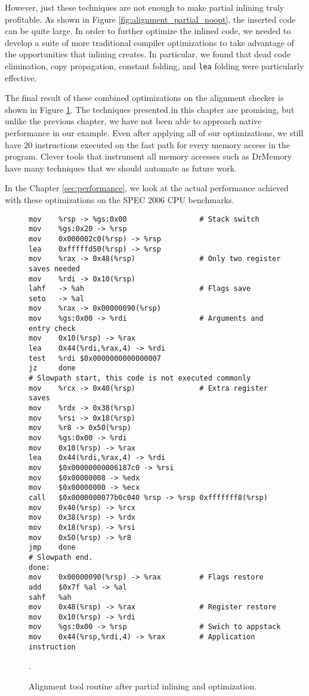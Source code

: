 However, just these techniques are not enough to make partial inlining truly
profitable.  As shown in Figure \ref{fig:alignment_partial_noopt}, the inserted
code can be quite large.  In order to further optimize the inlined code, we
needed to develop a suite of more traditional compiler optimizations to take
advantage of the opportunities that inlining creates.  In particular, we found
that dead code elimination, copy propagation, constant folding, and {\tt lea}
folding were particularly effective.

The final result of these combined optimizations on the alignment checker is
shown in Figure \ref{fig:alignment_all_opt}.  The techniques presented in this
chapter are promising, but unlike the previous chapter, we have not been able to
approach native performance in our example.  Even after applying all of our
optimizations, we still have 20 instructions executed on the fast path for every
memory access in the program.  Clever tools that instrument all memory accesses
such as DrMemory have many techniques that we should automate as future work.

In the Chapter \ref{sec:performance}, we look at the actual performance achieved
with these optimizations on the SPEC 2006 CPU benchmarks.

\begin{figure}
\begin{verbatim}
mov    %rsp -> %gs:0x00                 # Stack switch
mov    %gs:0x20 -> %rsp
mov    0x000002c0(%rsp) -> %rsp
lea    0xfffffd50(%rsp) -> %rsp
mov    %rax -> 0x48(%rsp)               # Only two register saves needed
mov    %rdi -> 0x10(%rsp)
lahf   -> %ah                           # Flags save
seto   -> %al
mov    %rax -> 0x00000090(%rsp)
mov    %gs:0x00 -> %rdi                 # Arguments and entry check
mov    0x10(%rsp) -> %rax
lea    0x44(%rdi,%rax,4) -> %rdi
test   %rdi $0x0000000000000007
jz     done
# Slowpath start, this code is not executed commonly
mov    %rcx -> 0x40(%rsp)               # Extra register saves
mov    %rdx -> 0x38(%rsp)
mov    %rsi -> 0x18(%rsp)
mov    %r8 -> 0x50(%rsp)
mov    %gs:0x00 -> %rdi
mov    0x10(%rsp) -> %rax
lea    0x44(%rdi,%rax,4) -> %rdi
mov    $0x00000000006187c0 -> %rsi
mov    $0x00000008 -> %edx
mov    $0x00000000 -> %ecx
call   $0x0000000077b0c040 %rsp -> %rsp 0xfffffff8(%rsp)
mov    0x40(%rsp) -> %rcx
mov    0x38(%rsp) -> %rdx
mov    0x18(%rsp) -> %rsi
mov    0x50(%rsp) -> %r8
jmp    done
# Slowpath end.
done:
mov    0x00000090(%rsp) -> %rax         # Flags restore
add    $0x7f %al -> %al
sahf   %ah
mov    0x48(%rsp) -> %rax               # Register restore
mov    0x10(%rsp) -> %rdi
mov    %gs:0x00 -> %rsp                 # Swich to appstack
mov    0x44(%rsp,%rdi,4) -> %rax        # Application instruction
\end{verbatim}
\caption{Alignment tool routine after partial inlining and optimization.}
\label{fig:alignment_all_opt}.
\end{figure}
